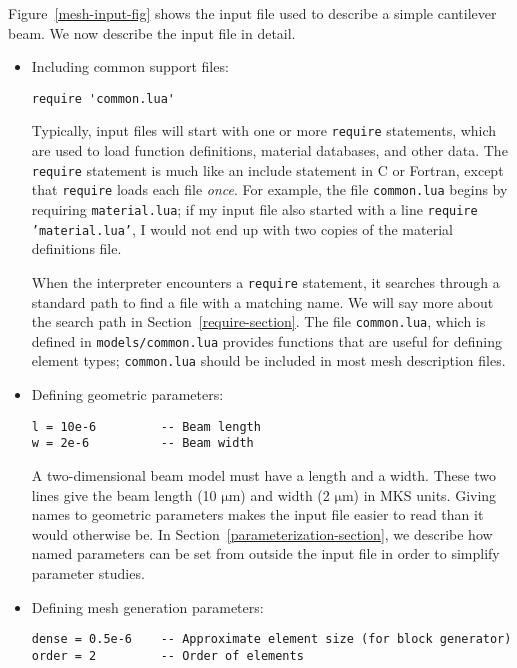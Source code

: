 \documentclass{article}
\newcommand{\mum}{\ensuremath{\mathrm{\mu m}}}
\newcommand{\ttt}[1]{\texttt{#1}}
\begin{document}
Figure~\ref{mesh-input-fig} shows the input file used to describe a
simple cantilever beam.  We now describe the input file in detail.  

\begin{itemize}

\item Including common support files:
\begin{verbatim}
require 'common.lua'
\end{verbatim}

Typically, input files will start with one or more \ttt{require}
statements, which are used to load function definitions, material
databases, and other data.  The \ttt{require} statement is much
like an include statement in C or Fortran, except that
\ttt{require} loads each file \emph{once}.  For example, the file
\ttt{common.lua} begins by requiring \ttt{material.lua}; if my
input file also started with a line \ttt{require 'material.lua'},
I would not end up with two copies of the material definitions file.

When the interpreter encounters a \ttt{require} statement, it
searches through a standard path to find a file with a matching name.
We will say more about the search path in
Section~\ref{require-section}.  The file \ttt{common.lua}, which is
defined in \ttt{models/common.lua} provides functions that are
useful for defining element types; \ttt{common.lua} should be
included in most mesh description files.

\item Defining geometric parameters:
\begin{verbatim}
l = 10e-6         -- Beam length
w = 2e-6          -- Beam width
\end{verbatim}

A two-dimensional beam model must have a length and a width.  These
two lines give the beam length (10 \mum) and width (2 \mum) in MKS
units.  Giving names to geometric parameters makes the input file
easier to read than it would otherwise be.  In
Section~\ref{parameterization-section}, we describe how named
parameters can be set from outside the input file in order to simplify
parameter studies.

\item Defining mesh generation parameters:
\begin{verbatim}
dense = 0.5e-6    -- Approximate element size (for block generator)
order = 2         -- Order of elements
\end{verbatim}


\end{itemize}
\end{document}
